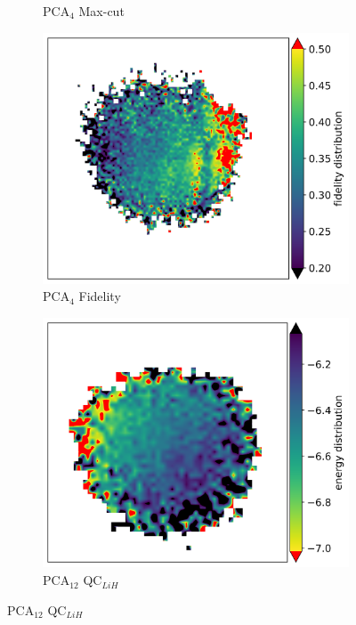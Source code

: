 \documentclass{article} %
\begin{document}
\begin{figure}[ht]
\begin{subfigure}{0.23\textwidth}
        \caption{PCA$_4$ Max-cut}
        \label{fig:PCA-4-Max-cut}
    \end{subfigure}
    \begin{subfigure}{0.23\textwidth}
        \centering
        \includegraphics[width=\textwidth]{images/fidelity-model-circuits_4_qubits_quantum_arch2vec_full_embedding_full_embedding_smooth.png}
        \caption{PCA$_4$ Fidelity}
        \label{fig:PCA-4-Fidelity}
    \end{subfigure}
    \begin{subfigure}{0.23\textwidth}
        \centering
        \includegraphics[width=\textwidth]{images/vqe-model-circuits_12_qubits_quantum_arch2vec_full_embedding_full_embedding_smooth.png}
        \caption{PCA$_{12}$ QC$_{LiH}$}
        \label{fig:PCA-12}
    \end{subfigure}
    

\end{figure}
\end{document}
